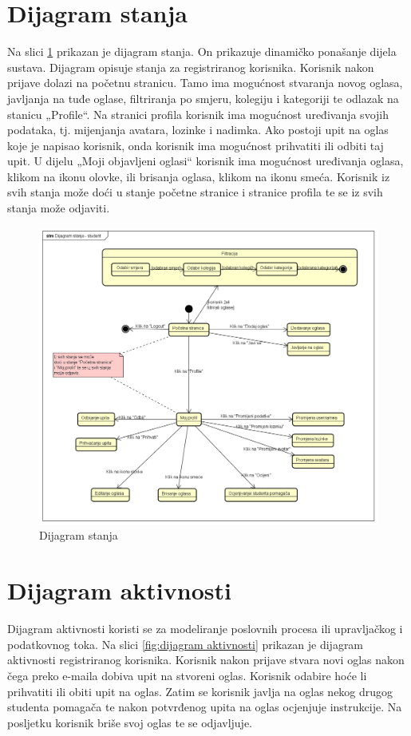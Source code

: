 			\eject
		\section{Dijagram stanja}
			Na slici \ref{fig:dijagram stanja} prikazan je dijagram stanja. On prikazuje dinamičko ponašanje dijela sustava. Dijagram opisuje stanja za registriranog korisnika. Korisnik nakon prijave dolazi na početnu stranicu. Tamo ima mogućnost stvaranja novog oglasa, javljanja na tuđe oglase, filtriranja po smjeru, kolegiju i kategoriji te odlazak na stanicu „Profile“. Na stranici profila korisnik ima mogućnost uređivanja svojih podataka, tj. mijenjanja avatara, lozinke i nadimka. Ako postoji upit na oglas koje je napisao korisnik, onda korisnik ima mogućnost prihvatiti ili odbiti taj upit. U dijelu „Moji objavljeni oglasi“ korisnik ima mogućnost uređivanja oglasa, klikom na ikonu olovke, ili brisanja oglasa, klikom na ikonu smeća. Korisnik iz svih stanja može doći u stanje početne stranice i stranice profila te se iz svih stanja može odjaviti.
		
			\begin{figure}[H]
				\includegraphics[scale=0.45]{dijagrami/DijagramStanja.png}
				\centering
				\caption{Dijagram stanja}
				\label{fig:dijagram stanja}
			\end{figure}
			
			\eject 
		
		\section{Dijagram aktivnosti}
			Dijagram aktivnosti koristi se za modeliranje poslovnih procesa ili upravljačkog i podatkovnog toka. Na slici \ref{fig:dijagram aktivnosti} prikazan je dijagram aktivnosti registriranog korisnika. Korisnik nakon prijave stvara novi oglas nakon čega preko e-maila dobiva upit na stvoreni oglas. Korisnik odabire hoće li prihvatiti ili obiti upit na oglas. Zatim se korisnik javlja na oglas nekog drugog studenta pomagača te nakon potvrđenog upita na oglas ocjenjuje instrukcije. Na posljetku korisnik briše svoj oglas te se odjavljuje.
			
